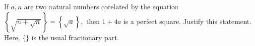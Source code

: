 If $ a,n $ are two natural numbers corelated by the equation $ \left\{ \sqrt{n+\sqrt n}\right\} =\left\{ \sqrt a\right\} , $ then $ 
1+4a $ is a perfect square. Justify this statement. Here, $ \{\} $ is the usual fractionary part.